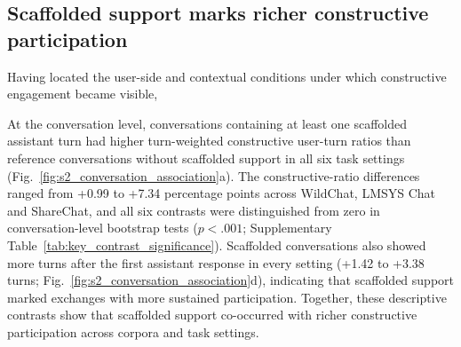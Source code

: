 \subsection{Scaffolded support marks richer constructive participation}
\label{subsec:2.3}

Having located the user-side and contextual conditions under which constructive engagement became visible,  

 At the conversation level, conversations containing at least one scaffolded assistant turn had higher turn-weighted constructive user-turn ratios than reference conversations without scaffolded support in all six task settings (Fig.~\ref{fig:s2_conversation_association}a). The constructive-ratio differences ranged from +0.99 to +7.34 percentage points across WildChat, LMSYS Chat and ShareChat, and all six contrasts were distinguished from zero in conversation-level bootstrap tests ($p<.001$; Supplementary Table~\ref{tab:key_contrast_significance}). Scaffolded conversations also showed more turns after the first assistant response in every setting (+1.42 to +3.38 turns; Fig.~\ref{fig:s2_conversation_association}d), indicating that scaffolded support marked exchanges with more sustained participation. Together, these descriptive contrasts show that scaffolded support co-occurred with richer constructive participation across corpora and task settings.



